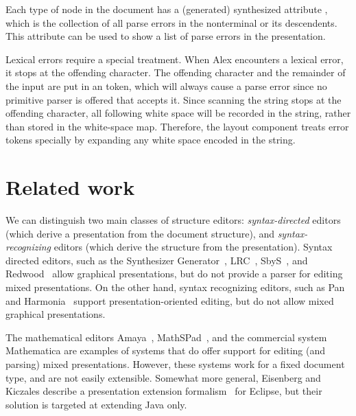 \documentclass{article}[10pt]
\begin{document}
Each type of node in the document has a (generated) synthesized attribute , which is the collection of all parse errors in the nonterminal or its descendents. This attribute can be used to show a list of parse errors in the presentation. 


Lexical errors require a special treatment. When Alex encounters a lexical error, it stops at the offending character. The offending character and the remainder of the input are put in an  token, which will always cause a parse error since no primitive parser is offered that accepts it. Since scanning the string stops at the offending character, all following white space  will be recorded in the string, rather than stored in the white-space map. Therefore, the layout component treats error tokens specially by expanding any white space encoded in the string. %






%
\section{Related work}\label{sect:relatedWork}
%


We can distinguish two main classes of structure editors: {\em syntax-directed} editors (which derive a presentation from the document structure), and {\em syntax-recognizing} editors (which derive the structure from the presentation). Syntax directed editors, such as the Synthesizer Generator~\cite{reps84synGen}, LRC~\cite{saraiva00lrc}, SbyS~\cite{magnusson90orm}, and Redwood~\cite{westphal04redwood} allow graphical presentations, but do not provide a parser for editing mixed presentations. On the other hand, syntax recognizing editors, such as Pan~\cite{ballance92pan} and Harmonia~\cite{boshernitsan01harmonia} support presentation-oriented editing, but do not allow mixed graphical presentations.

The mathematical editors Amaya~\cite{amaya08}, MathSPad~\cite{verhoeven00mathspad}, and the commercial system Mathematica are examples of systems that do offer support for editing (and parsing) mixed presentations. However, these systems work for a fixed document type, and are not easily extensible. Somewhat more general, Eisenberg and Kiczales describe a presentation extension formalism~\cite{eisenberg07presExtension} for Eclipse, but their solution is targeted at extending Java only.
\end{document}
